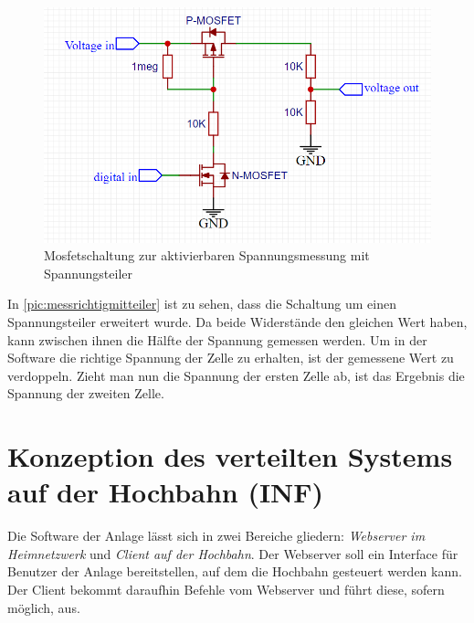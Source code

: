 \begin{figure}[h]
	\begin{center}
		\includegraphics[width=13cm]{messMitTeiler.PNG}
		\caption{\label{pic:messrichtigmitteiler} Mosfetschaltung zur aktivierbaren Spannungsmessung mit Spannungsteiler}
	\end{center}
\end{figure}

In \autoref{pic:messrichtigmitteiler} ist zu sehen, dass die Schaltung um einen Spannungsteiler erweitert wurde. Da beide Widerstände den gleichen Wert haben, kann zwischen ihnen die Hälfte der Spannung gemessen werden. 
Um in der Software die richtige Spannung der Zelle zu erhalten, ist der gemessene Wert zu verdoppeln. Zieht man nun die Spannung der ersten Zelle ab, ist das Ergebnis die Spannung der zweiten Zelle.

\chapter{Konzeption des verteilten Systems auf der Hochbahn (INF)}
\label{sec:software}
Die Software der Anlage lässt sich in zwei Bereiche gliedern: \textit{Webserver im Heimnetzwerk} und \textit{Client auf der Hochbahn}. Der Webserver soll ein Interface für Benutzer der Anlage bereitstellen, auf dem die Hochbahn gesteuert werden kann. 
Der Client bekommt daraufhin Befehle vom Webserver und führt diese, sofern möglich, aus. 


